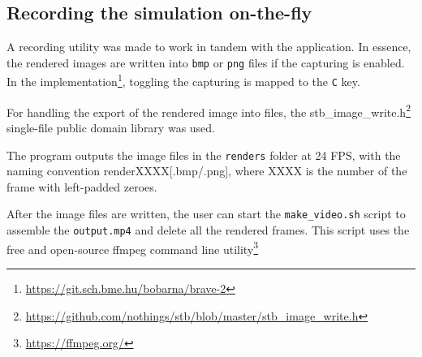 \documentclass[sigplan,screen,nonacm]{acmart}
\begin{document}
\subsection{Recording the simulation on-the-fly}
A recording utility was made to work in tandem with the application. In essence,
the rendered images are written into \texttt{bmp} or \texttt{png} files if the
capturing is enabled. In the
implementation\footnote{\url{https://git.sch.bme.hu/bobarna/brave-2}}, toggling
the capturing is mapped to the \texttt{C} key.


For handling the export of the rendered image into files, the
stb\_image\_write.h\footnote{\url{https://github.com/nothings/stb/blob/master/stb\_image\_write.h}}
single-file public domain library was used. 


The program outputs the image files in the \texttt{renders} folder at 24 FPS,
with the naming convention renderXXXX[.bmp/.png], where XXXX is the number of
the frame with left-padded zeroes.


After the image files are written, the user can start the
\texttt{make\_video.sh} script to assemble the \texttt{output.mp4} and delete
all the rendered frames. This script uses the free and open-source ffmpeg command
line utility\footnote{\url{https://ffmpeg.org/}}
\end{document}
